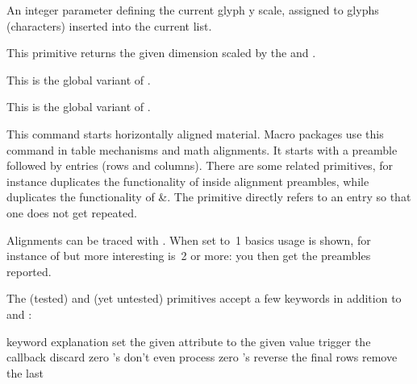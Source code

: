 \stopnewprimitive

\startnewprimitive[title={\prm {glyphyscale}}]

An integer parameter defining the current glyph y scale, assigned to glyphs
(characters) inserted into the current list.

\stopnewprimitive

\startnewprimitive[title={\prm {glyphyscaled}}]

This primitive returns the given dimension scaled by the  and
.

\stopnewprimitive

\startnewprimitive[title={\prm {gtoksapp}}]

This is the global variant of .

\stopnewprimitive

\startnewprimitive[title={\prm {gtokspre}}]

This is the global variant of .

\stopnewprimitive

\startoldprimitive[title={\prm {halign}}]

This command starts horizontally aligned material. Macro packages use this
command in table mechanisms and math alignments. It starts with a preamble
followed by entries (rows and columns). There are some related primitives, for
instance  duplicates the functionality of \type {#} inside
alignment preambles, while  duplicates the functionality of \type
{&}. The  primitive directly refers to an entry so that one
does not get repeated.

Alignments can be traced with . When set to~1 basics
usage is shown, for instance of  but more interesting is~2 or more:
you then get the preambles reported.

The  (tested) and  (yet untested) primitives accept a
few keywords in addition to  and :

\starttabulate[|l|p|]
\FL
\BC keyword            \BC explanation \NC \NR
\TL
\NC {}       \NC set the given attribute to the given value \NC \NR
\NC {}   \NC trigger the  callback \NC \NR
\NC {}    \NC discard zero 's \NC \NR
\NC {}    \NC don't even process zero 's \NC \NR
\NC {}    \NC reverse the final rows \NC \NR
\NC {} \NC remove the last  \NC \NR
\LL
\stoptabulate

